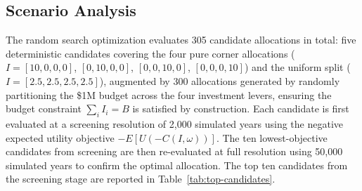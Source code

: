 \documentclass[10pt]{article}
\begin{document}
\begin{multicols}{2}
\subsection{Scenario Analysis}
 
The random search optimization evaluates 305 candidate allocations
in total: five deterministic candidates covering the four pure
corner allocations ($I = [10,0,0,0]$, $[0,10,0,0]$, $[0,0,10,0]$,
$[0,0,0,10]$) and the uniform split ($I = [2.5,2.5,2.5,2.5]$),
augmented by 300 allocations generated by randomly partitioning
the \$1M budget across the four investment levers, ensuring the
budget constraint $\sum_i I_i = B$ is satisfied by construction. Each candidate is first evaluated at a
screening resolution of 2{,}000 simulated years using the negative
expected utility objective $-E[U(-C(I,\omega))]$. The ten
lowest-objective candidates from screening are then re-evaluated at
full resolution using 50{,}000 simulated years to confirm the
optimal allocation. The top ten candidates from the screening stage
are reported in Table~\ref{tab:top-candidates}.
 
\begin{table}[H]
\centering
\caption{Top Ten Candidate Allocations from Random Search
         (Screening Stage, 2{,}000 Scenarios)}
\label{tab:top-candidates}
{\setlength{\tabcolsep}{3pt}
\footnotesize
{}
}
\end{table}
 

\end{multicols}
\end{document}
